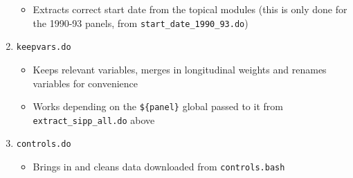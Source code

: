 \documentclass{article}
\begin{document}
\begin{enumerate}
\begin{itemize}
	\item Extracts correct start date from the topical modules (this is only done for the 1990-93 panels, from {\tt start\_date\_1990\_93.do})
	\end{itemize}
\item {\tt keepvars.do}
	\begin{itemize}
	\item Keeps relevant variables, merges in longitudinal weights and renames variables for convenience
	\item Works depending on the {\tt \$\{panel\}} global passed to it from {\tt extract\_sipp\_all.do} above
	\end{itemize}
\item {\tt controls.do}
	\begin{itemize}
	\item Brings in and cleans data downloaded from {\tt controls.bash}
	\end{itemize}
\end{enumerate}
\end{document}
